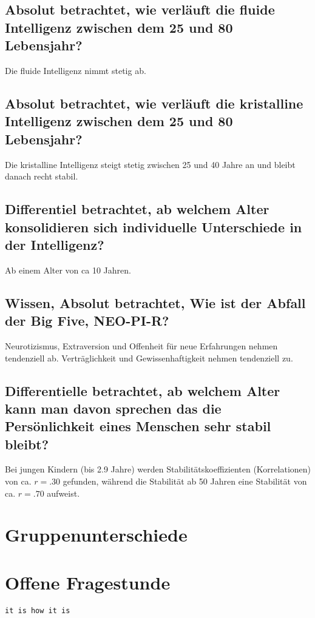 \documentclass[a6paper,10pt,DIV=40]{scrartcl}
\begin{document}
\subsection{Absolut betrachtet, wie verläuft die fluide Intelligenz zwischen dem 25 und 80 Lebensjahr?}
Die fluide Intelligenz nimmt stetig ab.
\subsection{Absolut betrachtet, wie verläuft die kristalline Intelligenz zwischen dem 25 und 80 Lebensjahr?}
Die kristalline Intelligenz steigt stetig zwischen 25 und 40 Jahre an und bleibt danach recht stabil.
\subsection{Differentiel betrachtet, ab welchem Alter konsolidieren sich individuelle Unterschiede in der Intelligenz?}
Ab einem Alter von ca 10 Jahren.
\subsection{Wissen, Absolut betrachtet, Wie ist der Abfall der Big Five, NEO-PI-R?}
Neurotizismus, Extraversion und Offenheit für neue Erfahrungen nehmen tendenziell ab. Verträglichkeit und Gewissenhaftigkeit nehmen tendenziell zu.
\subsection{Differentielle betrachtet, ab welchem Alter kann man davon sprechen das die Persönlichkeit eines Menschen sehr stabil bleibt?}
Bei jungen Kindern (bis 2.9 Jahre) werden Stabilitätskoeffizienten (Korrelationen) von ca. $r = .30$ gefunden, während die Stabilität ab 50 Jahren eine Stabilität von ca. $r = .70$ aufweist.

\section{Gruppenunterschiede}

\section{Offene Fragestunde}

\begin{Verbatim}[samepage=true, frame=single]
it is how it is
\end{Verbatim}
\end{document}
